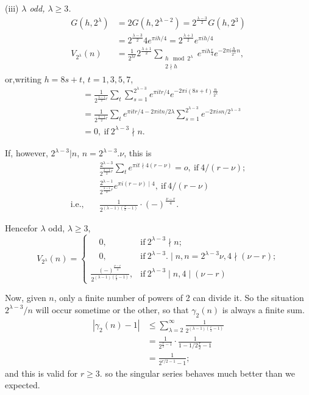 (iii) \textit{$\lambda$ odd, $\lambda \geq 3$.}
\begin{align*}
  G(h, 2^\lambda) &= 2 G(h, 2^{\lambda-2})= 2^{\frac{\lambda -3}{2}}
  G(h, 2^3)\\
  & = 2^{\frac{\lambda-3}{2}} 4 e^{\pi i h/4} =
  2^{\frac{\lambda+1}{2}} e^{\pi i h/4}\\
  V_{2^\lambda} (n) & = \frac{1}{2^{\lambda r}} 2^{\frac{\lambda+1}{2}}
  \sum_{\substack{h \mod 2^\lambda\\2\nmid h}} e^{\pi i h \frac{r}{4}} e^{-
  2 \pi i \frac{h}{2^\lambda} n},
\end{align*}
or,\pageoriginale writing \quad $h= 8 s+t$, $t= 1, 3, 5, 7$,
\begin{align*}
  & = \frac{1}{2^{\frac{\lambda -1}{2}r}} \sum_t
  \sum^{2^{\lambda-3}}_{s=1} e^{\pi i t r/4} e^{-2 \pi i (8 s+t)
    \frac{n}{2^\lambda}}\\
  & = \frac{1}{2^{\frac{\lambda-1}{2} r}} \sum_t e^{\pi i t r/4 - 2
    \pi i t n/2 \lambda } \sum^{2^{\lambda-3}}_{s=1} e^{- 2 \pi i s n
    /2^{\lambda-3}}\\
  & = 0, ~\text{if}~ 2^{\lambda-3}\nmid n.
\end{align*}

If, however, $2^{\lambda-3}|n$, $n= 2^{\lambda -3}. \nu$, this is 
\begin{align*}
  & \frac{2^{\lambda-3}}{2^{\frac{\lambda-1}{2}r}} \sum_t e^{\pi i
    t\nmid 4
    (r-\nu)} = o, ~\text{if}~ 4 /(r-\nu);\\
  & \frac{2^{\lambda-1}}{2^{\frac{\lambda-1}{2}r}} e^{\pi i
    (r-\nu)\mid 4},
  ~\text{if}~ 4/(r - \nu)\\
  \text{i.e.,} \quad & \frac{1}{2^{(\lambda-1)(\frac{r}{2}-1)}} \cdot
  (-)^{\frac{\nu -r}{4}}.
\end{align*}

Hence\pageoriginale for $\lambda$ odd, $\lambda \geq 3$,
\begin{equation*}
  V_{2^\lambda} (n) = 
  \begin{cases}
    \quad 0, & \text{if}~ 2^{\lambda -3} \nmid n;\\
    \quad 0, & \text{if}~ 2^{\lambda -3}. \mid n, n=2^{\lambda -3}\nu, 4
    \nmid (\nu - r);\\
    \frac{(-)^{\frac{\nu -r}{4}}}{2^{(\lambda -1)(\frac{r}{2}-1)}}, &
    \text{if}~ 2^{\lambda -3}\mid n, 4\mid (\nu-r)
  \end{cases} \tag{**}\label{part4:lec37:eq**}
\end{equation*}

Now, given $n$, only a finite number of powers of 2 can divide it. So
the situation $2^{\lambda -3}/n$ will occur sometime or the other, so
that $\gamma_2(n)$ is always a finite sum.
\begin{align*}
  |\gamma_2 (n) -1| & \leq \sum^\infty_{\lambda =2}
  \frac{1}{2^{(\lambda -1)(\frac{r}{2}-1)}}\\
  & = \frac{1}{2^{\frac{r}{2}-1}} \cdot \frac{1}{1-1/2
    \frac{r}{2}-1}\\
  & = \frac{1}{2^{r/2-1}-1};
\end{align*}
and this is valid for $r \geq 3$. so the singular series behaves much
better than we expected.

